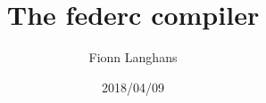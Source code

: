\documentclass[11pt,a4paper]{report}
\date{2018/04/09}
\author{Fionn Langhans}
\title{\Huge \textbf{The federc compiler}}
\begin{document}
\begin{titlepage}
\maketitle
\end{titlepage}

\tableofcontents



\end{document}
